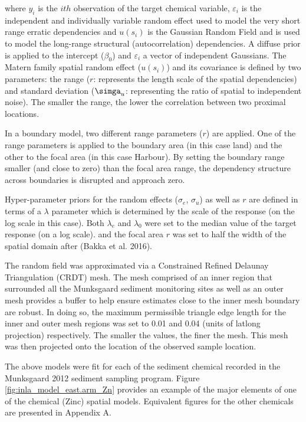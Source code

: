 \documentclass[a4paper]{article}
\begin{document}
where \(y_i\) is the \(ith\) observation of the target chemical
variable, \(\varepsilon_i\) is the independent and individually variable
random effect used to model the very short range erratic dependencies
and \(u(s_i)\) is the Gaussian Random Field and is used to model the
long-range structural (autocorrelation) dependencies. A diffuse prior is
applied to the intercept (\(\beta_0\)) and \(\varepsilon_i\) a vector of
independent Gaussians. The Matern family spatial random effect
(\(u(s_i)\)) and its covariance is defined by two parameters: the range
(\(r\): represents the length scale of the spatial dependencies) and
standard deviation (\(\simga_u\): representing the ratio of spatial to
independent noise). The smaller the range, the lower the correlation
between two proximal locations.

In a boundary model, two different range parameters (\(r\)) are applied.
One of the range parameters is applied to the boundary area (in this
case land) and the other to the focal area (in this case Harbour). By
setting the boundary range smaller (and close to zero) than the focal
area range, the dependency structure across boundaries is disrupted and
approach zero.

Hyper-parameter priors for the random effects (\(\sigma_e\),
\(\sigma_u\)) as well as \(r\) are defined in terms of a \(\lambda\)
parameter which is determined by the scale of the response (on the log
scale in this case). Both \(\lambda_e\) and \(\lambda_0\) were set to
the median value of the target response (on a log scale). and the focal
area \(r\) was set to half the width of the spatial domain after (Bakka
et al. 2016).

The random field was approximated via a Constrained Refined Delaunay
Triangulation (CRDT) mesh. The mesh comprised of an inner region that
surrounded all the Munksgaard sediment monitoring sites as well as an
outer mesh provides a buffer to help ensure estimates close to the inner
mesh boundary are robust. In doing so, the maximum permissible triangle
edge length for the inner and outer mesh regions was set to 0.01 and
0.04 (units of latlong projection) respectively. The smaller the values,
the finer the mesh. This mesh was then projected onto the location of
the observed sample location.

The above models were fit for each of the sediment chemical recorded in
the Munksgaard 2012 sediment sampling program. Figure
\ref{fig:inla_model_east.arm_Zn} provides an example of the major
elements of one of the chemical (Zinc) spatial models. Equivalent
figures for the other chemicals are presented in Appendix A.
\end{document}
